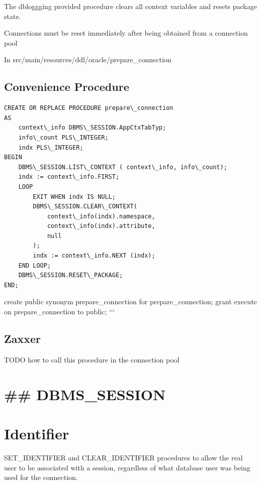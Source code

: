 \documentclass[letterpaper,10pt,english]{sphinxmanual}
\begin{document}
The dbloggging provided procedure clears all context variables and
resets package state.

Connections must be reset immediately after being obtained from a
connection pool

In src/main/resources/ddl/oracle/prepare\_connection


\subsection{Convenience Procedure}
\label{index:convenience-procedure}
\begin{Verbatim}[commandchars=\\\{\}]
CREATE OR REPLACE PROCEDURE prepare\_connection
AS
    context\_info DBMS\_SESSION.AppCtxTabTyp;
    info\_count PLS\_INTEGER;
    indx PLS\_INTEGER;
BEGIN
    DBMS\_SESSION.LIST\_CONTEXT ( context\_info, info\_count);
    indx := context\_info.FIRST;
    LOOP
        EXIT WHEN indx IS NULL;
        DBMS\_SESSION.CLEAR\_CONTEXT(
            context\_info(indx).namespace,
            context\_info(indx).attribute,
            null
        );
        indx := context\_info.NEXT (indx);
    END LOOP;
    DBMS\_SESSION.RESET\_PACKAGE;
END;
\end{Verbatim}

create public synonym prepare\_connection for prepare\_connection; grant
execute on prepare\_connection to public; {}`{}`{}`


\subsection{Zaxxer}
\label{index:zaxxer}
TODO how to call this procedure in the connection pool


\section{\#\# DBMS\_SESSION}
\label{index:dbms-session}

\section{Identifier}
\label{index:identifier}
SET\_IDENTIFIER and CLEAR\_IDENTIFIER procedures to allow the real user
to be associated with a session, regardless of what database user was
being used for the connection.
\end{document}
